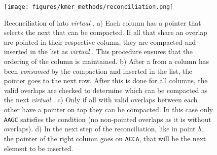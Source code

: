 \begin{figure}[H]
	\centering
	\texttt{[image: figures/kmer\_methods/reconciliation.png]}
	\caption[Reconciliation of \kmers into \emph{virtual} \skmers.]{Reconciliation of \kmers into \emph{virtual} \skmers. a) Each column has a pointer that selects the next \kmer that can be compacted. If all \kmers that share an overlap are pointed in their respective column, they are compacted and inserted in the list as \emph{virtual} \skmers. This procedure ensures that the ordering of the column is maintained. b) After a \kmer from a column has been \emph{consumed} by the compaction and inserted in the list, the pointer goes to the next row. After this is done for all columns, the valid overlaps are checked to determine which \kmers can be compacted as the next \emph{virtual} \skmer. c) Only if all \kmers with valid overlaps between each other have a pointer on top they can be compacted. In this case only \texttt{AAGC} satisfies the condition (no non-pointed overlaps as it is without overlaps).  d) In the next step of the reconciliation, like in point \emph{b}, the pointer of the right column goes on \texttt{ACCA}, that will be the next element to be inserted.}
	\label{fig:reconciliation}
\end{figure}

